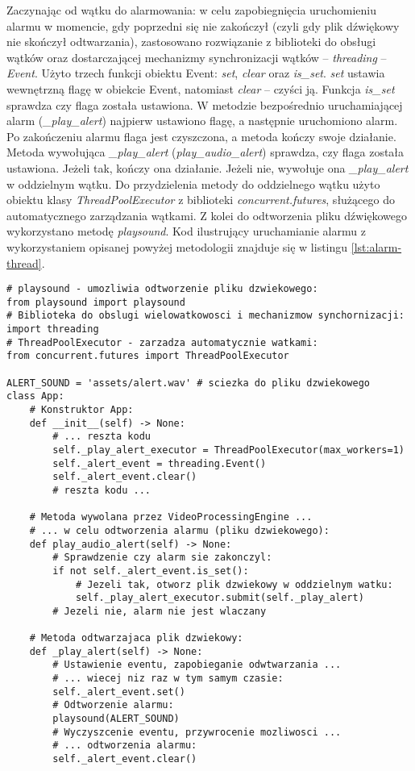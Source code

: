 Zaczynając od wątku do alarmowania: w celu zapobiegnięcia uruchomieniu alarmu w momencie, gdy poprzedni się nie zakończył (czyli gdy plik dźwiękowy nie skończył odtwarzania), zastosowano rozwiązanie z biblioteki do obsługi wątków oraz dostarczającej mechanizmy synchronizacji wątków -- \emph{threading} -- \emph{Event}. Użyto trzech funkcji obiektu Event: \emph{set}, \emph{clear} oraz \emph{is\_set}. \emph{set} ustawia wewnętrzną flagę w obiekcie Event, natomiast \emph{clear} -- czyści ją. Funkcja \emph{is\_set} sprawdza czy flaga została ustawiona. W metodzie bezpośrednio uruchamiającej alarm (\emph{\_play\_alert}) najpierw ustawiono flagę, a następnie uruchomiono alarm. Po zakończeniu alarmu flaga jest czyszczona, a metoda kończy swoje działanie. Metoda wywołująca \emph{\_play\_alert} (\emph{play\_audio\_alert}) sprawdza, czy flaga została ustawiona. Jeżeli tak, kończy ona działanie. Jeżeli nie, wywołuje ona \emph{\_play\_alert} w oddzielnym wątku. Do przydzielenia metody do oddzielnego wątku użyto obiektu klasy \emph{ThreadPoolExecutor} z biblioteki \emph{concurrent.futures}, służącego do automatycznego zarządzania wątkami. Z kolei do odtworzenia pliku dźwiękowego wykorzystano metodę \emph{playsound}.
Kod ilustrujący uruchamianie alarmu z wykorzystaniem opisanej powyżej metodologii znajduje się w listingu \ref{lst:alarm-thread}.

\begin{lstlisting}[caption={Kod uruchamiający alarm dźwiękowy oraz zapobiegający wielu symultaicznym uruchomieniom.}, label={lst:alarm-thread}]
# playsound - umozliwia odtworzenie pliku dzwiekowego:
from playsound import playsound 
# Biblioteka do obslugi wielowatkowosci i mechanizmow synchornizacji:
import threading
# ThreadPoolExecutor - zarzadza automatycznie watkami:
from concurrent.futures import ThreadPoolExecutor

ALERT_SOUND = 'assets/alert.wav' # sciezka do pliku dzwiekowego
class App:
    # Konstruktor App:
    def __init__(self) -> None:
        # ... reszta kodu
        self._play_alert_executor = ThreadPoolExecutor(max_workers=1)
        self._alert_event = threading.Event()
        self._alert_event.clear()    
        # reszta kodu ...

    # Metoda wywolana przez VideoProcessingEngine ...
    # ... w celu odtworzenia alarmu (pliku dzwiekowego):
    def play_audio_alert(self) -> None:
        # Sprawdzenie czy alarm sie zakonczyl:
        if not self._alert_event.is_set():
            # Jezeli tak, otworz plik dzwiekowy w oddzielnym watku: 
            self._play_alert_executor.submit(self._play_alert)
        # Jezeli nie, alarm nie jest wlaczany

    # Metoda odtwarzajaca plik dzwiekowy:
    def _play_alert(self) -> None:
        # Ustawienie eventu, zapobieganie odwtwarzania ...
        # ... wiecej niz raz w tym samym czasie: 
        self._alert_event.set()
        # Odtworzenie alarmu:
        playsound(ALERT_SOUND)
        # Wyczyszcenie eventu, przywrocenie mozliwosci ... 
        # ... odtworzenia alarmu:
        self._alert_event.clear()
\end{lstlisting}


